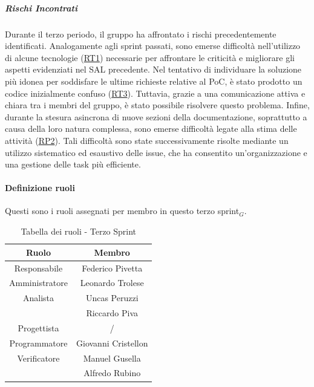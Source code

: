 \documentclass[10pt]{article}
\begin{document}
{{{{    \subparagraph*{Rischi Incontrati}\mbox{}

    Durante il terzo periodo, il gruppo ha affrontato i rischi precedentemente identificati. Analogamente agli sprint passati, sono emerse difficoltà nell'utilizzo di alcune tecnologie (\hyperref[RT1]{RT1}) necessarie per affrontare le criticità e migliorare gli aspetti evidenziati nel SAL precedente. Nel tentativo di individuare la soluzione più idonea per soddisfare le ultime richieste relative al PoC, è stato prodotto un codice inizialmente confuso (\hyperref[RT3]{RT3}). Tuttavia, grazie a una comunicazione attiva e chiara tra i membri del gruppo, è stato possibile risolvere questo problema.
    Infine, durante la stesura asincrona di nuove sezioni della documentazione, soprattutto a causa della loro natura complessa, sono emerse difficoltà legate alla stima delle attività (\hyperref[RP2]{RP2}). Tali difficoltà sono state successivamente risolte mediante un utilizzo sistematico ed esaustivo delle issue, che ha consentito un'organizzazione e una gestione delle task più efficiente.
    
    \paragraph{Definizione ruoli}\mbox{}\vspace{0.4em}
    
    Questi sono i ruoli assegnati per membro in questo terzo sprint$_G$.\\
    \begin{table}[H]
        \centering
        \begin{tabular}{|c|c|}
        \hline
        \rowcolor{gray!25}
        \textbf{Ruolo} & \textbf{Membro}\\
        \hline
        Responsabile & Federico Pivetta\\
        \hline
        Amministratore & Leonardo Trolese\\ 
        \hline
        Analista & Uncas Peruzzi\\
        & Riccardo Piva\\
        \hline
        Progettista & / \\
        \hline
        Programmatore & Giovanni Cristellon \\
        \hline
        Verificatore & Manuel Gusella\\
        & Alfredo Rubino\\
        \hline
        \end{tabular}
        \caption{Tabella dei ruoli - Terzo Sprint}
    \end{table}

}}}}
\end{document}
